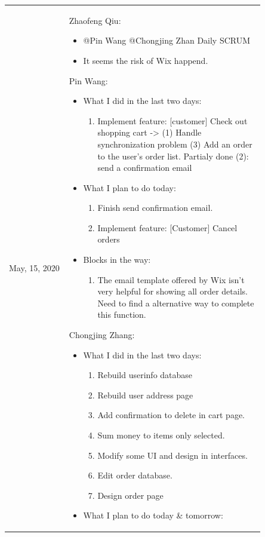 \documentclass{report}
\begin{document}
\begin{tabularx}{0.95\linewidth}{%
  >{\raggedright\arraybackslash}p{0.2\linewidth}%
  >{\raggedright\arraybackslash}p{0.65\linewidth}}
  \\
  \midrule
  May, 15, 2020 
  & 
  Zhaofeng Qiu:
  \begin{itemize}
    \item @Pin Wang @Chongjing Zhan Daily SCRUM
    \item It seems the risk of Wix happend.
  \end{itemize}
  Pin Wang:
  \begin{itemize}
    \item What I did in the last two days: 
    \begin{enumerate}
      \item Implement feature: [customer] Check out shopping cart -> (1) Handle synchronization problem (3) Add an order to the user's order list. Partialy done (2): send a confirmation email
    \end{enumerate}
    \item What I plan to do today: 
    \begin{enumerate}
      \item Finish send confirmation email. 
      \item Implement feature: [Customer] Cancel orders
    \end{enumerate}
    \item Blocks in the way: 
    \begin{enumerate}
      \item The email template offered by Wix isn't very helpful for showing all order details. Need to find a alternative way to complete this function.
    \end{enumerate}
  \end{itemize}
  Chongjing Zhang:
  \begin{itemize}
    \item What I did in the last two days: 
    \begin{enumerate}
      \item Rebuild userinfo database 
      \item Rebuild user address page 
      \item Add confirmation to delete in cart page. 
      \item Sum money to items only selected. 
      \item Modify some UI and design in interfaces. 
      \item Edit order database. 
      \item Design order page 
    \end{enumerate}
    \item What I plan to do today \& tomorrow:

\end{itemize}
\end{tabularx}
\end{document}
